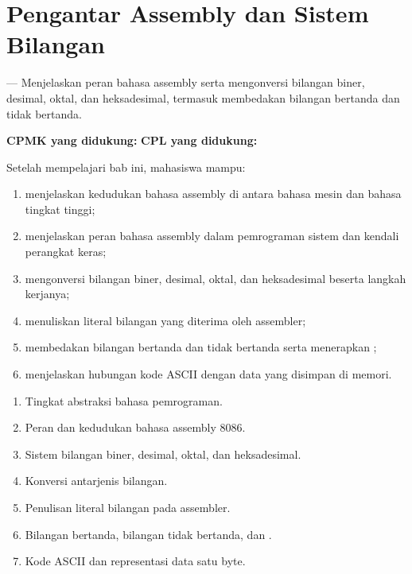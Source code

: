 \documentclass[../../main.tex]{subfiles}
\begin{document}
\chapter{Pengantar Assembly dan Sistem Bilangan}
\label{chap:pengantar-assembly}


\begin{subcpmkbox}
\vspace{1.1em}
 --- Menjelaskan peran bahasa assembly serta mengonversi
bilangan biner, desimal, oktal, dan heksadesimal, termasuk membedakan
bilangan bertanda dan tidak bertanda.

\vspace{0.4em}
\textbf{CPMK yang didukung:}  \quad\textbullet\quad
\textbf{CPL yang didukung:} 
\end{subcpmkbox}

\begin{tujuanbox}
\vspace{1.1em}
Setelah mempelajari bab ini, mahasiswa mampu:
\begin{enumerate}
    \item menjelaskan kedudukan bahasa assembly di antara bahasa mesin
          dan bahasa tingkat tinggi;
    \item menjelaskan peran bahasa assembly dalam pemrograman sistem
          dan kendali perangkat keras;
    \item mengonversi bilangan biner, desimal, oktal, dan heksadesimal
          beserta langkah kerjanya;
    \item menuliskan literal bilangan yang diterima oleh assembler;
    \item membedakan bilangan bertanda dan tidak bertanda serta
          menerapkan ;
    \item menjelaskan hubungan kode ASCII dengan data yang disimpan di
          memori.
\end{enumerate}
\end{tujuanbox}

\begin{materibox}
\vspace{1.1em}
\begin{enumerate}
    \item Tingkat abstraksi bahasa pemrograman.
    \item Peran dan kedudukan bahasa assembly 8086.
    \item Sistem bilangan biner, desimal, oktal, dan heksadesimal.
    \item Konversi antarjenis bilangan.
    \item Penulisan literal bilangan pada assembler.
    \item Bilangan bertanda, bilangan tidak bertanda, dan
          .
    \item Kode ASCII dan representasi data satu byte.
\end{enumerate}
\end{materibox}










\end{document}
